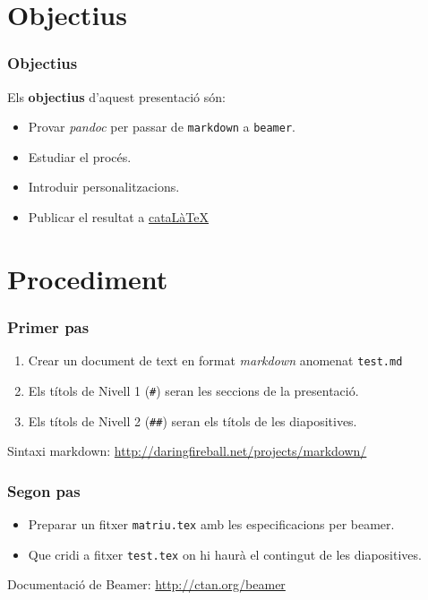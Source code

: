 
%

\section{Objectius}

\begin{frame}[fragile]\frametitle{Objectius}

Els \textbf{objectius} d'aquest presentació són:

\begin{itemize}[<+->]
\item
  Provar \emph{pandoc} per passar de \texttt{markdown} a
  \texttt{beamer}.
\item
  Estudiar el procés.
\item
  Introduir personalitzacions.
\item
  Publicar el resultat a
  \href{http://phobos.xtec.cat/jqueralt}{cataLàTeX}
\end{itemize}
\end{frame}

\section{Procediment}

\begin{frame}[fragile]\frametitle{Primer pas}

\begin{enumerate}[1.]
\item
  Crear un document de text en format \emph{markdown} anomenat
  \texttt{test.md}
\item
  Els títols de Nivell 1 (\texttt{\#}) seran les seccions de la
  presentació.
\item
  Els títols de Nivell 2 (\texttt{\#\#}) seran els títols de les
  diapositives.
\end{enumerate}
Sintaxi markdown: \url{http://daringfireball.net/projects/markdown/}

\end{frame}

\begin{frame}[fragile]\frametitle{Segon pas}

\begin{itemize}
\item
  Preparar un fitxer \texttt{matriu.tex} amb les especificacions per
  beamer.
\item
  Que cridi a fitxer \texttt{test.tex} on hi haurà el contingut de les
  diapositives.
\end{itemize}
Documentació de Beamer: \url{http://ctan.org/beamer}

\end{frame}

